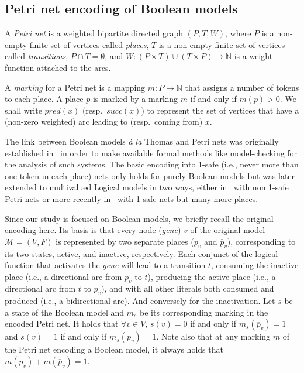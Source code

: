 \documentclass[runningheads]{llncs}
\begin{document}
\subsection{Petri net encoding of Boolean models}%
\label{sec:encoding}

\begin{definition}

  A \emph{Petri net} is a weighted bipartite directed graph \((P, T, W)\),
  where \(P\) is a non-empty finite set of vertices called \emph{places},
  \(T\) is a non-empty finite set of vertices called \emph{transitions},
  \(P \cap T = \emptyset\),
  and \(W : (P \times T) \cup (T \times P) \mapsto \mathbb{N} \) is a weight function attached to the arcs.

\end{definition}
A \emph{marking} for a Petri net is a mapping \(m : P \mapsto \mathbb{N}\) that assigns a number of tokens to each place. A place \(p\) is marked by a marking \(m\) if and only if \(m(p) > 0\). We shall write \(pred(x)\) (resp.\ \(succ(x)\)) to represent the set of vertices that have a (non-zero weighted) arc leading to (resp.\ coming from) \(x\).

The link between Boolean models \emph{à la} Thomas and Petri nets was originally established in~\cite{chaouiya2004qualitative} in order to make available formal methods like model-checking for the analysis of such systems.
The basic encoding into 1-safe (i.e., never more than one token in each place) nets only holds for purely Boolean models but was later extended to multivalued Logical models in two ways, either in~\cite{chaouiya2011petri} with non 1-safe Petri nets or more recently in~\cite{chatain2014characterization} with 1-safe nets but many more places.

Since our study is focused on Boolean models, we briefly recall the original encoding here.
Its basis is that every node (\emph{gene}) \(v\) of the original model \(\mathcal{M} = (V, F)\) is represented by two separate places (\(p_v\) and \(\overline{p}_v\)), corresponding to its two states, active, and inactive, respectively.
Each conjunct of the logical function that activates the \emph{gene} will lead to a transition \(t\), consuming the inactive place (i.e., a directional arc from \(\overline{p}_v\) to \(t\)), producing the active place (i.e., a directional arc from \(t\) to \(p_v\)), and with all other literals both consumed and produced (i.e., a bidirectional arc).
And conversely for the inactivation.
Let \(s\) be a state of the Boolean model and \(m_s\) be its corresponding marking in the encoded Petri net. It holds that \(\forall v \in V\), \(s(v) = 0\) if and only if \(m_s(\overline{p}_v) = 1\) and \(s(v) = 1\) if and only if \(m_s(p_v) = 1\). Note also that at any marking \(m\) of the Petri net encoding a Boolean model, it always holds that \(m(p_v) + m(\overline{p}_v) = 1\).
\end{document}
